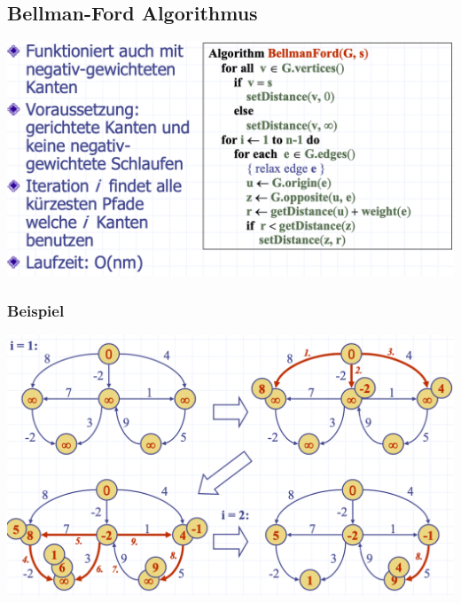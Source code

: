 \subsection{Bellman-Ford Algorithmus}
\begin{center}
    \includegraphics[scale=.25]{graphic/15 ShortestPathTrees/Bellman-Ford1.png}
\end{center}
\vspace{-8pt}
\subsubsection{Beispiel}
\begin{center}
    \includegraphics[scale=.25]{graphic/15 ShortestPathTrees/Bellman-Ford2.png}
\end{center}
\vspace{-8pt}

